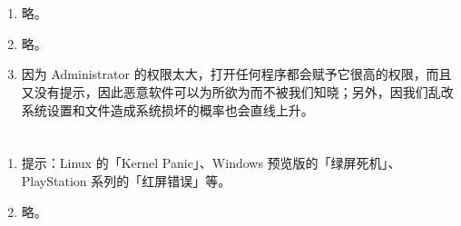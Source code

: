 \section{}

\begin{enumerate}
  \item 略。
  \item 略。
  \item 因为 Administrator 的权限太大，打开任何程序都会赋予它很高的权限，而且又没有提示，因此恶意软件可以为所欲为而不被我们知晓；另外，因我们乱改系统设置和文件造成系统损坏的概率也会直线上升。
\end{enumerate}

\section{}

\begin{enumerate}
  \item 提示：Linux 的「Kernel Panic」、Windows 预览版的「绿屏死机」、PlayStation 系列的「红屏错误」等。
  \item 略。
\end{enumerate}
